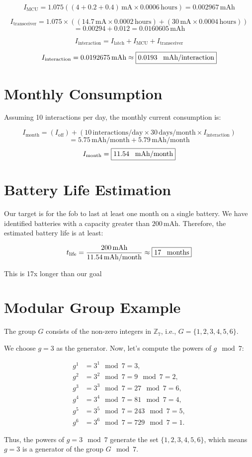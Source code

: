 \documentclass{article}
\begin{document}
\[
I_{\text{MCU}} = 1.075((4 + 0.2 + 0.4) \, \text{mA} \times 0.0006 \, \text{hours}) = 0.002967 \, \text{mAh}
\]

\[
I_{\text{transceiver}} =1.075\times((14.7 \, \text{mA} \times 0.0002 \, \text{hours}) + (30 \, \text{mA} \times 0.0004 \, \text{hours})) \]
\[
= 0.00294 + 0.012  = 0.0160605 \, \text{mAh}
\]


\[
I_{\text{interaction}} = I_{\text{latch}} + I_{\text{MCU}} + I_{\text{transceiver}}
\]

\[
I_{\text{interaction}} = 0.0192675 \, \text{mAh} \approx \fbox{0.0193 \, \text{mAh/interaction}}
\]

\section{Monthly Consumption}
Assuming 10 interactions per day, the monthly current consumption is:

\[
I_{\text{month}} = (I_{\text{off}}) +  (10 \, \text{interactions/day} \times 30 \, \text{days/month} \times I_{\text{interaction}}) 
\]
\[
=  5.75 \, \text{mAh/month} + 5.79 \, \text{mAh/month}
\]
\[
I_{\text{month}} = \fbox{11.54  \, \text{mAh/month}}
\]


\section{Battery Life Estimation}
Our target is for the fob to last at least one month on a single battery. We have identified batteries with a capacity greater than \(200 \, \text{mAh}\). Therefore, the estimated battery life is at least:

\[
t_{\text{life}} = \frac{200 \, \text{mAh}}{11.54 \, \text{mAh/month}} \approx \fbox{17 \, \text{months}}
\]

This is 17x longer than our goal

\section{Modular Group Example}
The group \( G \) consists of the non-zero integers in \( \mathbb{Z}_7 \), i.e., \( G = \{1, 2, 3, 4, 5, 6\} \).

We choose \( g = 3 \) as the generator. Now, let's compute the powers of \( g \mod 7 \):

\[
\begin{aligned}
    g^1 & = 3^1 \mod 7 = 3, \\
    g^2 & = 3^2 \mod 7 = 9 \mod 7 = 2, \\
    g^3 & = 3^3 \mod 7 = 27 \mod 7 = 6, \\
    g^4 & = 3^4 \mod 7 = 81 \mod 7 = 4, \\
    g^5 & = 3^5 \mod 7 = 243 \mod 7 = 5, \\
    g^6 & = 3^6 \mod 7 = 729 \mod 7 = 1.
\end{aligned}
\]

Thus, the powers of \( g = 3 \mod 7 \) generate the set \( \{1, 2, 3, 4, 5, 6\} \), which means \( g = 3 \) is a generator of the group \( G \mod 7 \).
\end{document}
